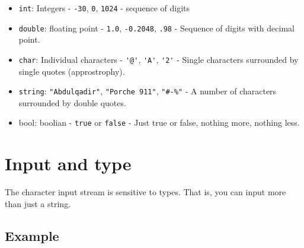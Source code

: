 \documentclass{book}
\begin{document}
\begin{itemize}
	\item \verb|int|: Integers {-} \verb|-30|, \verb|0|, \verb|1024| {-} sequence of digits
	\item \verb|double|: floating point {-} \verb|1.0|, \verb|-0.2048|, \verb|.98| {-} Sequence of digits with decimal point.
	\item \verb|char|: Individual characters {-} \verb|'@'|, \verb|'A'|, \verb|'2'| {-} Single characters surrounded by single quotes (approstrophy).
	\item \verb|string|: \verb|"Abdulqadir"|, \verb|"Porche 911"|, \verb|"#-%"| {-} A number of characters surrounded by double quotes.
	\item bool: boolian {-} \verb|true| or \verb|false| {-} Just true or false, nothing more, nothing less.
\end{itemize}

\section{Input and type}
The character input stream is sensitive to types. That is, you can input more than just a string.

\subsection*{Example}

\inputminted[linenos, frame=lines, fontsize=\small, tabsize=2]{c++}{./csc-201/4-read_name_and_age.cpp}
\end{document}
